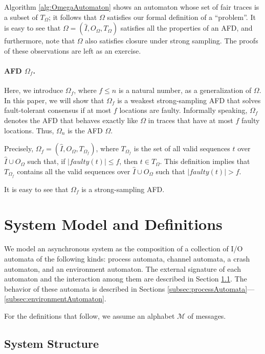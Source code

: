 \documentclass[11pt]{article}
\numberwithin{theorem}{section}
\begin{document}
Algorithm \ref{alg:OmegaAutomaton} shows an automaton whose set of
fair traces is a subset of $T_{\Omega}$; it follows that $\Omega$
satisfies our formal definition of a ``problem''.
It is easy to see that $\Omega = (\hat{I}, O_\Omega,T_\Omega)$
satisfies all the properties of an AFD, and furthermore, note that
$\Omega$ also satisfies closure under strong sampling. 
The proofs of these observations are left as an exercise.

\paragraph{AFD $\Omega_f$.}  Here, we introduce $\Omega_f$, where $f\leq n$ is a natural number, as a generalization of $\Omega$. In this paper, we will show that $\Omega_f$ is a weakest strong-sampling AFD that solves fault-tolerant consensus if at most $f$ locations are faulty.
Informally speaking, $\Omega_f$ denotes the AFD
that behaves exactly like $\Omega$ in traces that have at most $f$
faulty locations. Thus,  $\Omega_{n}$ is the AFD $\Omega$.

Precisely, $\Omega_f = (\hat{I},O_\Omega, T_{\Omega_f})$, where
$T_{\Omega_f}$ is the set of all valid sequences $t$ over $\hat{I}
\cup O_{\Omega}$ such that, if $|faulty(t)| \leq f$, then $t \in
T_{\Omega}$.
This definition implies that $T_{\Omega_f}$ contains all the valid
sequences over $\hat{I} \cup O_{\Omega}$  such that $|faulty(t)|> f$.

It is easy to see that $\Omega_f$ is a strong-sampling AFD.

\section{System Model and Definitions}
\label{sec:systemModel}

We model an asynchronous system as the composition of a collection of
I/O automata of the following kinds:  process automata, channel
automata, a crash automaton, and an environment automaton.
The external signature of each automaton and the interaction among
them are described in Section \ref{subsec:systemInteraction}. 
The behavior of these automata is described in Sections
\ref{subsec:processAutomata}---\ref{subsec:environmentAutomaton}. 

For the definitions that follow, we assume an alphabet $\mathcal{M}$
of messages.

\subsection{System Structure}
\label{subsec:systemInteraction}
\end{document}
